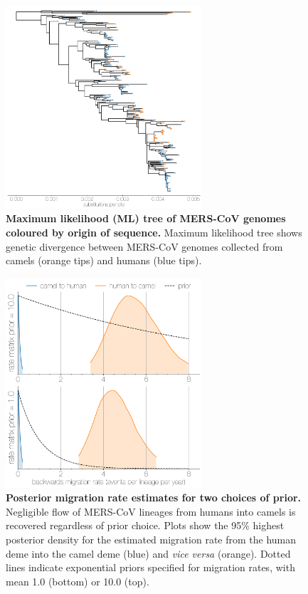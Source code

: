 \documentclass[9pt,lineno]{elife}
\begin{document}
\begin{figure}[h]
\centering
	\includegraphics[width=0.65\textwidth]{figures/mers_ML.png}
	\caption{\textbf{Maximum likelihood (ML) tree of MERS-CoV genomes coloured by origin of sequence.}
Maximum likelihood tree shows genetic divergence between MERS-CoV genomes collected from camels (orange tips) and humans (blue tips).
	}
	\label{ml}
\end{figure}

\begin{figure}[h]
\centering
	\includegraphics[width=0.65\textwidth]{figures/mers_prior.png}
	\caption{\textbf{Posterior migration rate estimates for two choices of prior.}
Negligible flow of MERS-CoV lineages from humans into camels is recovered regardless of prior choice.
Plots show the 95\% highest posterior density for the estimated migration rate from the human deme into the camel deme (blue) and \textit{vice versa} (orange).
Dotted lines indicate exponential priors specified for migration rates, with mean 1.0 (bottom) or 10.0 (top).
	}
	\label{prior}
\end{figure}
\end{document}
